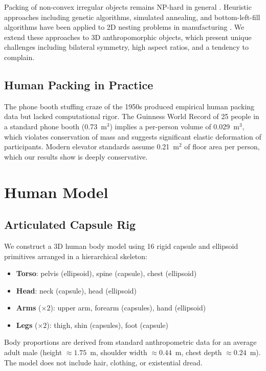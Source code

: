 \documentclass[11pt,letterpaper]{article}
\begin{document}
Packing of non-convex irregular objects remains NP-hard in general \cite{milenkovic1999}. Heuristic approaches including genetic algorithms, simulated annealing, and bottom-left-fill algorithms have been applied to 2D nesting problems in manufacturing \cite{bennell2008}. We extend these approaches to 3D anthropomorphic objects, which present unique challenges including bilateral symmetry, high aspect ratios, and a tendency to complain.

\subsection{Human Packing in Practice}

The phone booth stuffing craze of the 1950s \cite{phonebooth1959} produced empirical human packing data but lacked computational rigor. The Guinness World Record of 25 people in a standard phone booth (0.73~m$^3$) implies a per-person volume of 0.029~m$^3$, which violates conservation of mass and suggests significant elastic deformation of participants. Modern elevator standards \cite{asme2019} assume 0.21~m$^2$ of floor area per person, which our results show is deeply conservative.

\section{Human Model}
\label{sec:model}

\subsection{Articulated Capsule Rig}

We construct a 3D human body model using 16 rigid capsule and ellipsoid primitives arranged in a hierarchical skeleton:

\begin{itemize}
    \item \textbf{Torso}: pelvis (ellipsoid), spine (capsule), chest (ellipsoid)
    \item \textbf{Head}: neck (capsule), head (ellipsoid)
    \item \textbf{Arms} ($\times 2$): upper arm, forearm (capsules), hand (ellipsoid)
    \item \textbf{Legs} ($\times 2$): thigh, shin (capsules), foot (capsule)
\end{itemize}

Body proportions are derived from standard anthropometric data for an average adult male (height $\approx 1.75$~m, shoulder width $\approx 0.44$~m, chest depth $\approx 0.24$~m). The model does not include hair, clothing, or existential dread.
\end{document}
